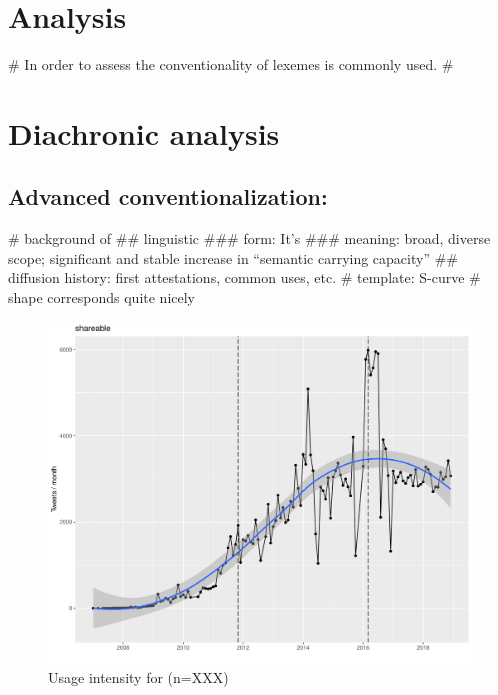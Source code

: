 \documentclass[
  a4paper,
  ]{scrartcl}
\begin{document}
\section{Analysis}

  \begin{easylist}[itemize]
    # In order to assess the conventionality of lexemes  is commonly used.
    #
  \end{easylist}

\section{Diachronic analysis}

  \subsection{Advanced conventionalization: }

    \begin{easylist}[itemize]
      # background of 
        ## linguistic
          ### form: It's
          ### meaning: broad, diverse scope; significant and stable increase in \enquote{semantic carrying capacity}
        ## diffusion history: first attestations, common uses, etc.
      # template: S-curve
        # shape corresponds quite nicely
    \end{easylist}

    \begin{figure}[H]
      \centering
      \includegraphics[width=\linewidth, height=.8\textheight, keepaspectratio]{images/ui_shareable.pdf}
      \caption{Usage intensity for  (n=XXX)}
    \end{figure}
\end{document}
